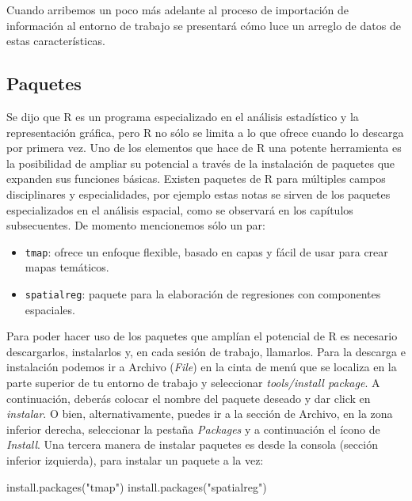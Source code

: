 \documentclass[
  11pt,
  oneside]{book}
\newenvironment{Shaded}{\begin{snugshade}}{\end{snugshade}}
\newcommand{\FunctionTok}[1]{\textcolor[rgb]{0.00,0.00,0.00}{#1}}
\newcommand{\NormalTok}[1]{#1}
\newcommand{\StringTok}[1]{\textcolor[rgb]{0.31,0.60,0.02}{#1}}
\providecommand{\tightlist}{%
  \setlength{\itemsep}{0pt}\setlength{\parskip}{0pt}}
\begin{document}
Cuando arribemos un poco más adelante al proceso de importación de información al entorno de trabajo se presentará cómo luce un arreglo de datos de estas características.

\hypertarget{paquetes}{%
\subsection{Paquetes}\label{paquetes}}

Se dijo que R es un programa especializado en el análisis estadístico y la representación gráfica, pero R no sólo se limita a lo que ofrece cuando lo descarga por primera vez. Uno de los elementos que hace de R una potente herramienta es la posibilidad de ampliar su potencial a través de la instalación de paquetes que expanden sus funciones básicas. Existen paquetes de R para múltiples campos disciplinares y especialidades, por ejemplo estas notas se sirven de los paquetes especializados en el análisis espacial, como se observará en los capítulos subsecuentes. De momento mencionemos sólo un par:

\begin{itemize}
\tightlist
\item
  \texttt{tmap}: ofrece un enfoque flexible, basado en capas y fácil de usar para crear mapas temáticos.\\
\item
  \texttt{spatialreg}: paquete para la elaboración de regresiones con componentes espaciales.
\end{itemize}

Para poder hacer uso de los paquetes que amplían el potencial de R es necesario descargarlos, instalarlos y, en cada sesión de trabajo, llamarlos. Para la descarga e instalación podemos ir a Archivo (\emph{File}) en la cinta de menú que se localiza en la parte superior de tu entorno de trabajo y seleccionar \emph{tools/install package}. A continuación, deberás colocar el nombre del paquete deseado y dar click en \emph{instalar}. O bien, alternativamente, puedes ir a la sección de Archivo, en la zona inferior derecha, seleccionar la pestaña \emph{Packages} y a continuación el ícono de \emph{Install}. Una tercera manera de instalar paquetes es desde la consola (sección inferior izquierda), para instalar un paquete a la vez:

\begin{Shaded}
\begin{Highlighting}[]
\FunctionTok{install.packages}\NormalTok{(}\StringTok{"tmap"}\NormalTok{)}
\FunctionTok{install.packages}\NormalTok{(}\StringTok{"spatialreg"}\NormalTok{)}
\end{Highlighting}
\end{Shaded}
\end{document}
